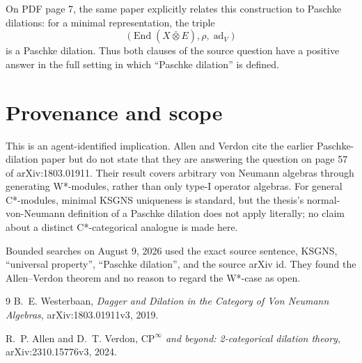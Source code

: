 \documentclass[10pt]{article}
\begin{document}
On PDF page 7, the same paper explicitly relates this construction to
Paschke dilations: for a minimal representation, the triple
\[
 \bigl(\operatorname{End}(X\mathbin{\bar\otimes}E),\rho,
       \operatorname{ad}_V\bigr)
\]
is a Paschke dilation. Thus both clauses of the source question have a
positive answer in the full setting in which ``Paschke dilation'' is defined.

\section*{Provenance and scope}

This is an agent-identified implication. Allen and Verdon cite the earlier
Paschke-dilation paper but do not state that they are answering the question
on page 57 of arXiv:1803.01911. Their result covers arbitrary von Neumann
algebras through generating W*-modules, rather than only type-I operator
algebras. For general C*-modules, minimal KSGNS uniqueness is standard, but
the thesis's normal-von-Neumann definition of a Paschke dilation does not
apply literally; no claim about a distinct C*-categorical analogue is made
here.

Bounded searches on August 9, 2026 used the exact source sentence, KSGNS,
``universal property'', ``Paschke dilation'', and the source arXiv id. They
found the Allen--Verdon theorem and no reason to regard the W*-case as open.

{\small
\begin{thebibliography}{9}
B.~E. Westerbaan,
\emph{Dagger and Dilation in the Category of Von Neumann Algebras},
arXiv:1803.01911v3, 2019.

R.~P. Allen and D.~T. Verdon,
\emph{$\mathrm{CP}^{\infty}$ and beyond: 2-categorical dilation theory},
arXiv:2310.15776v3, 2024.
\end{thebibliography}
}
\end{document}

